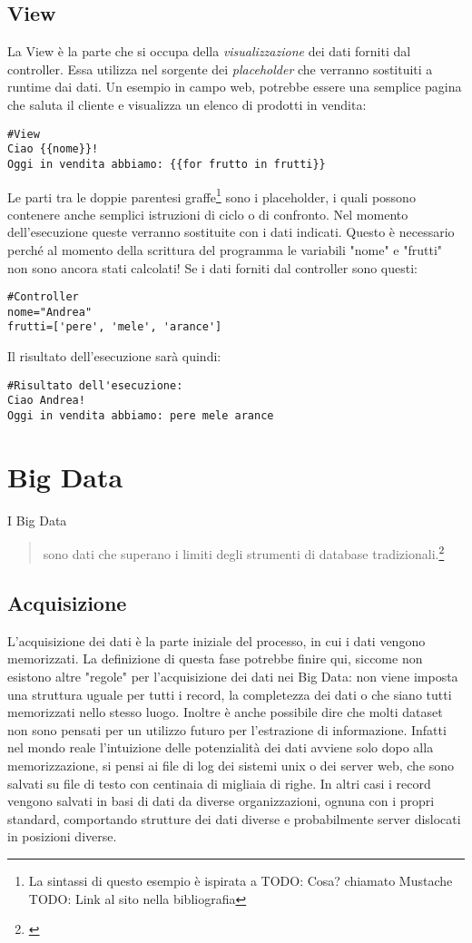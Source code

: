 \subsection{View}
La View è la parte che si occupa della \emph{visualizzazione} dei dati forniti dal controller. Essa utilizza nel sorgente dei \emph{placeholder} che verranno sostituiti a runtime dai dati.
Un esempio in campo web, potrebbe essere una semplice pagina che saluta il cliente e visualizza un elenco di prodotti in vendita:
\begin{verbatim}
#View
Ciao {{nome}}!
Oggi in vendita abbiamo: {{for frutto in frutti}}
\end{verbatim}
Le parti tra le doppie parentesi graffe\footnote{La sintassi di questo esempio è ispirata a TODO: Cosa? chiamato Mustache TODO: Link al sito nella bibliografia} sono i placeholder, i quali possono contenere anche semplici istruzioni di ciclo o di confronto. Nel momento dell'esecuzione queste verranno sostituite con i dati indicati. Questo è necessario perché al momento della scrittura del programma le variabili "nome" e "frutti" non sono ancora stati calcolati!
Se i dati forniti dal controller sono questi:
\begin{verbatim}
#Controller
nome="Andrea"
frutti=['pere', 'mele', 'arance']
\end{verbatim}
Il risultato dell'esecuzione sarà quindi:
\begin{verbatim}
#Risultato dell'esecuzione:
Ciao Andrea!
Oggi in vendita abbiamo: pere mele arance
\end{verbatim}



\section{Big Data}\label{sec:bigdata}
I Big Data
\begin{quotation}
sono dati che superano i limiti degli strumenti di database tradizionali.\footnote{\cite{rezzani2013big}}
\end{quotation} 



\subsection{Acquisizione}
L'acquisizione dei dati è la parte iniziale del processo, in cui i dati vengono memorizzati. La definizione di questa fase potrebbe finire qui, siccome non esistono altre "regole" per l'acquisizione dei dati nei Big Data: non viene imposta una struttura uguale per tutti i record, la completezza dei dati o che siano tutti memorizzati nello stesso luogo. Inoltre è anche possibile dire che molti dataset non sono pensati per un utilizzo futuro per l'estrazione di informazione. Infatti nel mondo reale l'intuizione delle potenzialità dei dati avviene solo dopo alla memorizzazione, si pensi ai file di log dei sistemi unix o dei server web, che sono salvati su file di testo con centinaia di migliaia di righe. In altri casi i record vengono salvati in basi di dati da diverse organizzazioni, ognuna con i propri standard, comportando strutture dei dati diverse e probabilmente server dislocati in posizioni diverse.

